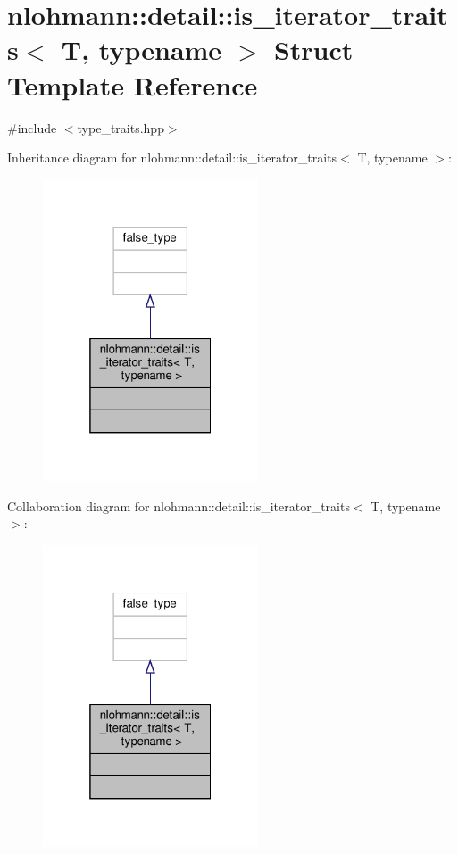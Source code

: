 \hypertarget{structnlohmann_1_1detail_1_1is__iterator__traits}{}\section{nlohmann\+:\+:detail\+:\+:is\+\_\+iterator\+\_\+traits$<$ T, typename $>$ Struct Template Reference}
\label{structnlohmann_1_1detail_1_1is__iterator__traits}


{\ttfamily \#include $<$type\+\_\+traits.\+hpp$>$}



Inheritance diagram for nlohmann\+:\+:detail\+:\+:is\+\_\+iterator\+\_\+traits$<$ T, typename $>$\+:
\nopagebreak
\begin{figure}[H]
\begin{center}
\leavevmode
\includegraphics[width=181pt]{structnlohmann_1_1detail_1_1is__iterator__traits__inherit__graph}
\end{center}
\end{figure}


Collaboration diagram for nlohmann\+:\+:detail\+:\+:is\+\_\+iterator\+\_\+traits$<$ T, typename $>$\+:
\nopagebreak
\begin{figure}[H]
\begin{center}
\leavevmode
\includegraphics[width=181pt]{structnlohmann_1_1detail_1_1is__iterator__traits__coll__graph}
\end{center}
\end{figure}


